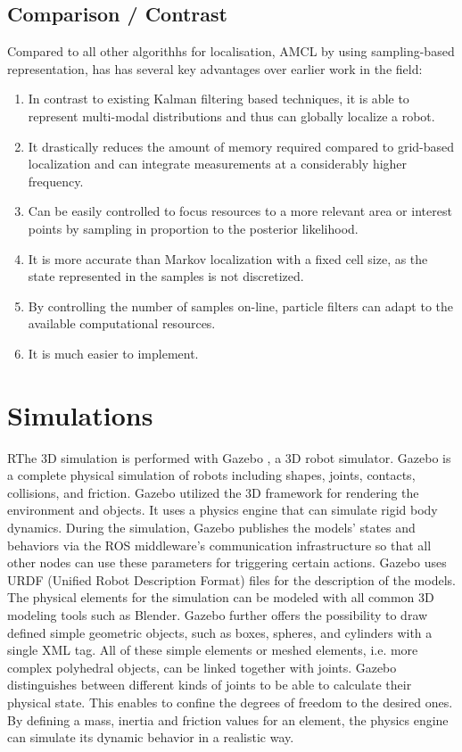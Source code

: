 \documentclass[10pt,journal,compsoc]{IEEEtran}
\begin{document}
    \subsection{Comparison / Contrast}
    Compared to all other algorithhs for localisation, AMCL by using sampling-based representation, has has
    several key advantages over earlier work in the field:
    \begin{enumerate}
        \item In contrast to existing Kalman filtering based techniques, it is able to represent multi-modal distributions and thus can globally localize a robot.
        \item It  drastically  reduces  the  amount  of  memory  required compared to grid-based localization and can integrate measurements at a considerably higher frequency.
        \item Can be easily controlled to focus resources to a more relevant area or interest points by sampling in proportion to the posterior likelihood.
        \item It is more accurate than Markov localization with a fixed cell size, as the state represented in  the samples is not discretized.
        \item By controlling the number of samples on-line, particle filters can adapt to the available computational resources.
        \item It is much easier to implement.
    \end {enumerate}

    \section{Simulations}
    RThe 3D simulation is performed with Gazebo , a 3D robot simulator. Gazebo is a complete physical simulation
    of robots including shapes, joints, contacts, collisions, and friction. Gazebo utilized the 3D framework for rendering the environment and objects.  It uses a physics engine that can simulate rigid body    dynamics. During the simulation, Gazebo publishes the models’ states and behaviors via the ROS middleware’s communication infrastructure so that all other nodes can use these parameters for triggering certain actions. Gazebo  uses  URDF  (Unified  Robot  Description  Format) files for the description of the models. The physical elements for the simulation can be modeled with all common 3D modeling tools such as Blender. Gazebo further offers the possibility to draw defined simple geometric objects, such as boxes, spheres, and
    cylinders  with  a  single  XML  tag.   All  of  these  simple  elements  or  meshed  elements,  i.e.  more complex  polyhedral objects, can be linked together with joints. Gazebo distinguishes between different kinds of joints to be able to calculate their physical state. This enables to confine the degrees of freedom to the desired ones. By defining a mass, inertia and friction values for an element, the physics engine can simulate its dynamic behavior in a realistic way.
\end{document}
